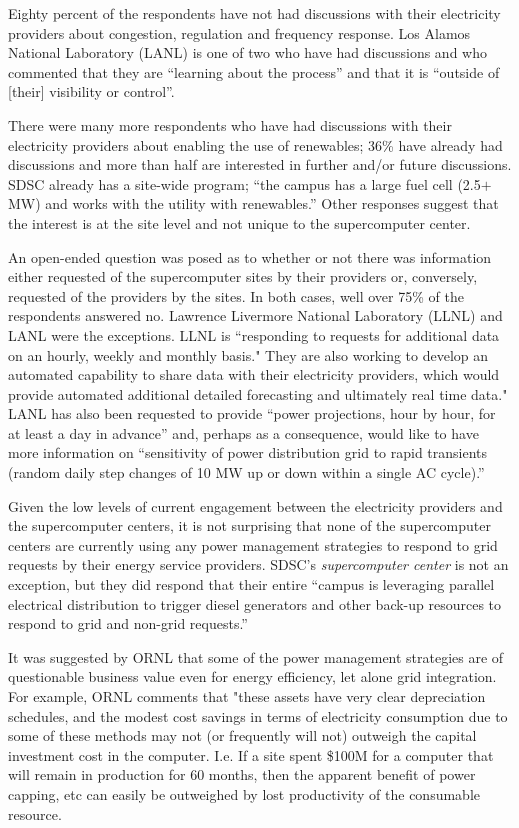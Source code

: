 Eighty percent of the respondents have not had discussions with their
electricity providers about congestion, regulation and frequency
response. Los Alamos National Laboratory (LANL) is one of two who have had discussions and who commented that
they are ``learning about the process'' and that it is ``outside of [their] visibility or control''.

There were many more respondents who have had discussions with their
electricity providers about enabling the use of renewables; 36{\%}
have already had discussions and more than half are interested in further
and/or future discussions. SDSC already has a site-wide program; ``the
campus has a large fuel cell (2.5$+$ MW) and works with the utility with
renewables.'' Other responses suggest that the interest is at the site level
and not unique to the supercomputer center.

An open-ended question was posed as to whether or not there was information
either requested of the supercomputer sites by their providers or,
conversely, requested of the providers by the sites. In both cases, well
over 75{\%} of the respondents answered no. Lawrence Livermore National Laboratory (LLNL) and LANL were the
exceptions. LLNL is ``responding to requests for additional data on an hourly, 
weekly and monthly basis."  They are also working to develop an automated capability to share 
data with their electricity providers, which would provide automated additional 
detailed forecasting and ultimately real time data."
LANL has also been requested to provide ``power projections, hour by hour,
for at least a day in advance'' and, perhaps as a consequence, would like to
have more information on ``sensitivity of power distribution grid to rapid
transients (random daily step changes of 10 MW up or down within a single AC
cycle).''

Given the low levels of current engagement between the electricity
providers and the supercomputer centers, it is not surprising that none of
the supercomputer centers are currently using any power management
strategies to respond to grid requests by their energy service
providers. SDSC's \textit{supercomputer center} is not an exception, but they did respond that their
entire ``campus is leveraging parallel electrical distribution to trigger
diesel generators and other back-up resources to respond to grid and
non-grid requests.''

It was suggested by ORNL that some of the power management strategies 
are of questionable business value even for energy efficiency, let alone grid integration.
For example, ORNL comments that "these assets have very clear depreciation schedules, and the modest cost 
savings in terms of electricity consumption due to some of these methods may not (or frequently will not) 
outweigh the capital investment cost in the computer.  I.e. If a site spent \$100M for a computer that will 
remain in production for 60 months, then the 
apparent benefit of power capping, etc can easily be outweighed by lost productivity of the consumable resource.

